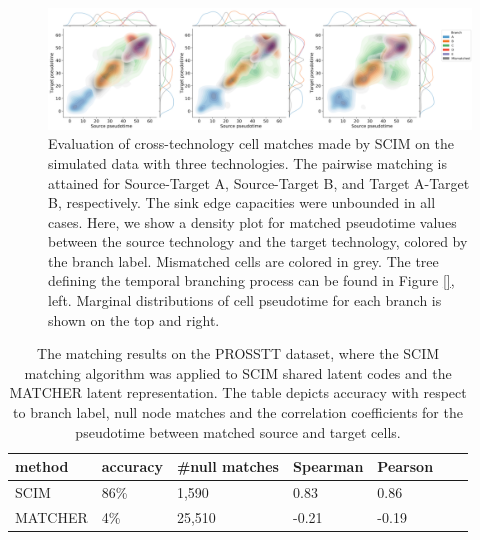 \begin{figure}[htb]
    \centering
    \includegraphics[width=1\textwidth]{figures/integration/3tech-pseudotime-kde.png}
    \caption{
    Evaluation of cross-technology cell matches made by SCIM on the simulated data with three technologies. 
    The pairwise matching is attained for Source-Target A, Source-Target B, and Target A-Target B, respectively. The sink edge capacities were unbounded in all cases.
    Here, we show a density plot for matched pseudotime values between the source technology and the target technology,
    colored by the branch label. Mismatched cells are colored in grey.
    The tree defining the temporal branching process can be found in Figure \ref{}, left.
    Marginal distributions of cell pseudotime for each branch is shown on the top and right.
    }
    \label{fig:prosstt5-3tech-pseudotime}
\end{figure}

\begin{table}
\centering
\begin{tabular}{l|llllll}
\toprule
  method & accuracy & \#null matches & Spearman & Pearson \\
\midrule
 SCIM    &   86\% &  1,590  & 0.83  & 0.86\\
 MATCHER &   4\%  & 25,510  & -0.21 & -0.19\\
\bottomrule
\end{tabular}
\caption{The matching results on the PROSSTT dataset, where the SCIM matching algorithm was applied to SCIM shared latent codes and the MATCHER latent representation. The table depicts accuracy with respect to branch label, null node matches and the correlation coefficients for the pseudotime between matched source and target cells.}
\label{tbl:prosstt_matcher}
\end{table}

